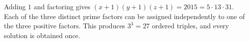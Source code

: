 Adding $1$ and factoring gives $(x+1)(y+1)(z+1)=2015=5\cdot13\cdot31$. Each of the three distinct prime factors can be assigned independently to one of the three positive factors. This produces $3^3=\boxed{27}$ ordered triples, and every solution is obtained once.
